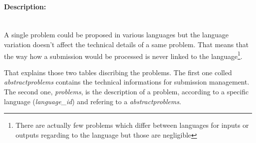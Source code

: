 \documentclass[../main.tex]{subfiles}
\begin{document}
\paragraph{Description:}~\\ %
A single problem could be proposed in various languages but the language variation doesn't affect the technical details of a same problem. That means that the way how a submission would be processed is never linked to the language\footnote{There are actually few problems which differ between languages for inputs or outputs regarding to the language but those are negligible}.

\begin{figure}
  \vspace{-20pt}
  \begin{center}
  \end{center}
  \vspace{-20pt}
\end{figure}

That explains those two tables discribing the problems. The first one colled \emph{abstractproblems} contains the technical informations for submission management. The second one, \emph{problems}, is the description of a problem, according to a specific language (\emph{language\_id}) and refering to a \emph{abstractproblems}.
\end{document}
